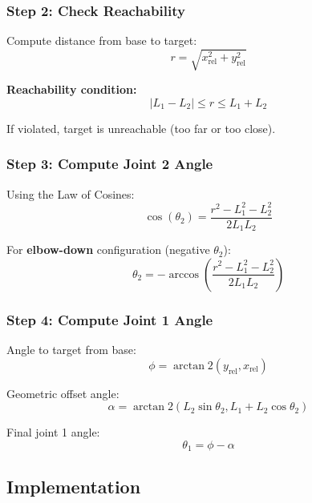 \documentclass[11pt,a4paper]{article}
\begin{document}
\subsubsection{Step 2: Check Reachability}

Compute distance from base to target:
\begin{equation}
r = \sqrt{x_{\text{rel}}^2 + y_{\text{rel}}^2}
\end{equation}

\textbf{Reachability condition:}
\begin{equation}
|L_1 - L_2| \leq r \leq L_1 + L_2
\end{equation}

If violated, target is unreachable (too far or too close).

\subsubsection{Step 3: Compute Joint 2 Angle}

Using the Law of Cosines:
\begin{equation}
\cos(\theta_2) = \frac{r^2 - L_1^2 - L_2^2}{2 L_1 L_2}
\end{equation}

For \textbf{elbow-down} configuration (negative $\theta_2$):
\begin{equation}
\theta_2 = -\arccos\left(\frac{r^2 - L_1^2 - L_2^2}{2 L_1 L_2}\right)
\end{equation}

\subsubsection{Step 4: Compute Joint 1 Angle}

Angle to target from base:
\begin{equation}
\phi = \arctan2(y_{\text{rel}}, x_{\text{rel}})
\end{equation}

Geometric offset angle:
\begin{equation}
\alpha = \arctan2(L_2 \sin\theta_2, L_1 + L_2 \cos\theta_2)
\end{equation}

Final joint 1 angle:
\begin{equation}
\theta_1 = \phi - \alpha
\end{equation}

\subsection{Implementation}
\end{document}
